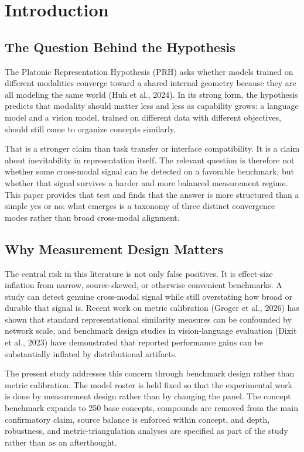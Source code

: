 \documentclass[10pt]{article}
\begin{document}
\section{Introduction}\label{introduction}

\subsection{The Question Behind the
Hypothesis}\label{the-question-behind-the-hypothesis}

The Platonic Representation Hypothesis (PRH) asks whether models trained
on different modalities converge toward a shared internal geometry
because they are all modeling the same world (Huh et al., 2024). In its
strong form, the hypothesis predicts that modality should matter less
and less as capability grows: a language model and a vision model,
trained on different data with different objectives, should still come
to organize concepts similarly.

That is a stronger claim than task transfer or interface compatibility.
It is a claim about inevitability in representation itself. The relevant
question is therefore not whether some cross-modal signal can be
detected on a favorable benchmark, but whether that signal survives a
harder and more balanced measurement regime. This paper provides that
test and finds that the answer is more structured than a simple yes or
no: what emerges is a taxonomy of three distinct convergence modes
rather than broad cross-modal alignment.

\subsection{Why Measurement Design
Matters}\label{why-measurement-design-matters}

The central risk in this literature is not only false positives. It is
effect-size inflation from narrow, source-skewed, or otherwise
convenient benchmarks. A study can detect genuine cross-modal signal
while still overstating how broad or durable that signal is. Recent work
on metric calibration (Groger et al., 2026) has shown that standard
representational similarity measures can be confounded by network scale,
and benchmark design studies in vision-language evaluation (Dixit et
al., 2023) have demonstrated that reported performance gains can be
substantially inflated by distributional artifacts.

The present study addresses this concern through benchmark design rather
than metric calibration. The model roster is held fixed so that the
experimental work is done by measurement design rather than by changing
the panel. The concept benchmark expands to 250 base concepts, compounds
are removed from the main confirmatory claim, source balance is enforced
within concept, and depth, robustness, and metric-triangulation analyses
are specified as part of the study rather than as an afterthought.
\end{document}
